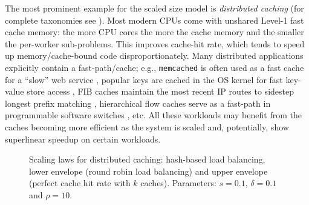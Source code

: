 

The most prominent example for the scaled size model is \emph{distributed caching} \cite{scalability-analyzed, sdn-analytitcs, dobb-2} (for complete taxonomies see \cite{556383, 7733347, 80148}).  Most modern CPUs come with unshared Level-1 fast cache memory: the more CPU cores the more the cache memory and the smaller the per-worker sub-problems. This improves cache-hit rate, which tends to speed up memory\slash cache-bound code disproportionately. Many distributed applications explicitly contain a fast-path\slash cache; e.g., \texttt{memcached} is often used as a fast cache for a ``slow'' web service \cite{180324,10.5555/1012889.1012894}, popular keys are cached in the OS kernel for fast key-value store access \cite{179747, ghigoff2021bmc}, FIB caches maintain the most recent IP routes to sidestep longest prefix matching \cite{rottenstreich2016optimal}, hierarchical flow caches serve as a fast-path in programmable software switches \cite{188960}, etc. All these workloads may benefit from the caches becoming more efficient as the system is scaled and, potentially, show superlinear speedup on certain workloads. %

\begin{figure}
  \centering
  \begin{small}
    
\end{small}
\caption{Scaling laws for distributed caching: hash-based load balancing, lower envelope (round robin load balancing) and upper envelope (perfect cache hit rate with $k$ caches). Parameters: $s=0.1$, $\delta=0.1$ and $\rho=10$.}
  \label{fig:dcache-analysis}
\end{figure}

